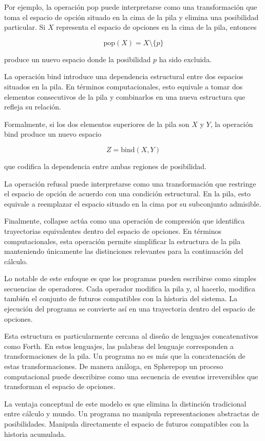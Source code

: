 \documentclass[12pt]{article}
\begin{document}
Por ejemplo, la operación pop puede interpretarse como una transformación que toma el espacio de opción situado en la cima de la pila y elimina una posibilidad particular. Si \(X\) representa el espacio de opciones en la cima de la pila, entonces

\[
\mathrm{pop}(X) = X \setminus \{p\}
\]

produce un nuevo espacio donde la posibilidad \(p\) ha sido excluida.

La operación bind introduce una dependencia estructural entre dos espacios situados en la pila. En términos computacionales, esto equivale a tomar dos elementos consecutivos de la pila y combinarlos en una nueva estructura que refleja su relación.

Formalmente, si los dos elementos superiores de la pila son \(X\) y \(Y\), la operación bind produce un nuevo espacio

\[
Z = \mathrm{bind}(X,Y)
\]

que codifica la dependencia entre ambas regiones de posibilidad.

La operación refusal puede interpretarse como una transformación que restringe el espacio de opción de acuerdo con una condición estructural. En la pila, esto equivale a reemplazar el espacio situado en la cima por su subconjunto admisible.

Finalmente, collapse actúa como una operación de compresión que identifica trayectorias equivalentes dentro del espacio de opciones. En términos computacionales, esta operación permite simplificar la estructura de la pila manteniendo únicamente las distinciones relevantes para la continuación del cálculo.

Lo notable de este enfoque es que los programas pueden escribirse como simples secuencias de operadores. Cada operador modifica la pila y, al hacerlo, modifica también el conjunto de futuros compatibles con la historia del sistema. La ejecución del programa se convierte así en una trayectoria dentro del espacio de opciones.

Esta estructura es particularmente cercana al diseño de lenguajes concatenativos como Forth. En estos lenguajes, las palabras del lenguaje corresponden a transformaciones de la pila. Un programa no es más que la concatenación de estas transformaciones. De manera análoga, en Spherepop un proceso computacional puede describirse como una secuencia de eventos irreversibles que transforman el espacio de opciones.

La ventaja conceptual de este modelo es que elimina la distinción tradicional entre cálculo y mundo. Un programa no manipula representaciones abstractas de posibilidades. Manipula directamente el espacio de futuros compatibles con la historia acumulada.
\end{document}
